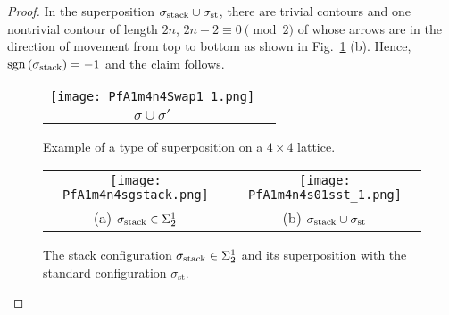 \documentclass[12pt,reqno]{amsart}
\numberwithin{equation}{section}
\newcommand{\sg}{\sigma}
\newcommand{\sgn}{{\operatorname{sgn}\,}}
\begin{document}
\begin{proof}
In the superposition $\sg_{\rm stack}\cup\sg_{\textrm{st}}$, there are trivial contours and one nontrivial contour of length $2n$, $2n-2\equiv 0 \pmod 2$ of whose arrows are in the direction of movement from top to bottom as shown in Fig.\ \ref{F3} (b). Hence, $\sgn(\sg_{\rm stack})=-1$ and the claim follows.
\begin{figure}[h]
\begin{tabular}{c c}
\texttt{[image: PfA1m4n4Swap1\_1.png]} 
\\
$\sg\cup\sg'$ &\hspace{.5in} 
\end{tabular}
\caption{Example of a type of superposition on a $4\times 4$ lattice.}
\label{F3}
\end{figure}

\begin{figure}[h]
\begin{tabular}{c c}
\texttt{[image: PfA1m4n4sgstack.png]}&\hspace{.5in} \texttt{[image: PfA1m4n4s01sst\_1.png]}\\
(a) $\sg_{\rm stack}\in\Sigma_2^1$ &\hspace{.5in} (b) $\sg_{\rm stack}\cup\sg_{\textrm{st}}$ 
\end{tabular}
\caption{The stack configuration $\sg_{\rm stack}\in\Sigma_2^1$ and its superposition with the standard configuration $\sg_{\textrm{st}}$.}
\label{F3a}
\end{figure}
\end{proof}
\end{document}
